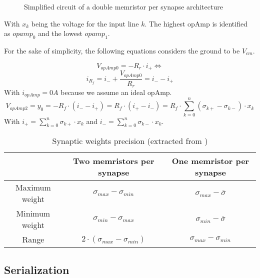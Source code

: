 \begin{figure}[H]
  \centering
  
  \caption{Simplified circuit of a double memristor per synapse architecture}
  \label{circt:doubleMem}
\end{figure}

With $x_k$ being the voltage for the input line $k$. The highest \ac{opAmp} is identified as $opamp_0$ and the lowest $opamp_1$.

For the sake of simplicity, the following equations considers the ground to be $V_{cm}$.

\begin{equation}
  \label{eq:doubleMem0}
  V_{opAmp0}=-R_r\cdot i_+ \Leftrightarrow
\end{equation}
\begin{equation}
  \label{eq:doubleMem1}
  i_{R_f}=i_-+\frac{V_{opAmp0}}{R_r}=i_--i_+
\end{equation}
With $i_{opAmp}=0A$ because we assume an ideal \ac{opAmp}.
\begin{equation}
  \label{eq:doubleMem2}
  V_{opAmp2}=y_0=-R_f\cdot(i_--i_+)=R_f\cdot(i_+-i_-)=R_f\cdot\sum_{k=0}^n(\sigma_{k+}-\sigma_{k-})\cdot x_k
\end{equation}
With $i_+=\sum_{k=0}^n\sigma_{k+}\cdot x_k$ and $i_-=\sum_{k=0}^n\sigma_{k-}\cdot x_k$.


\begin{table}[H]
  \centering
  \begin{tabular}{|c|c|c|}
    \cline{2-3}
    \rowcolor{gray}
    \multicolumn{1}{c|}{\cellcolor[HTML]{FFFFFF}} & Two memristors per synapse & One memristor per synapse \\
    \hline
    Maximum weight & $\sigma_{max}-\sigma_{min}$ & $\sigma_{max} -\overline{\sigma}$\\
    \hline
    Minimum weight & $\sigma_{min}-\sigma_{max}$ & $\sigma_{min} -\overline{\sigma}$\\
    \hline
    Range & $2\cdot(\sigma_{max}-\sigma_{min})$&$\sigma_{max}-\sigma_{min}$\\
    \hline
  \end{tabular}
  \caption{Synaptic weights precision (extracted from \cite{doubleMem})}
  \label{tab:synapses}
\end{table}

\subsection{Serialization}
\label{subsec:serpar}

